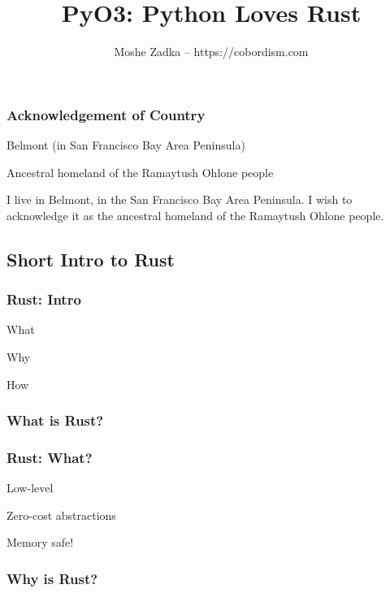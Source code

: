 \documentclass[ignorenonframetext]{beamer}
\title{PyO3: Python Loves Rust}
\author{Moshe Zadka -- https://cobordism.com}
\date{}
\begin{document}
\begin{titlepage}
\maketitle
\end{titlepage}

\frame{\titlepage}

\begin{frame}
\frametitle{Acknowledgement of Country}

Belmont (in San Francisco Bay Area Peninsula)

Ancestral homeland of the Ramaytush Ohlone people

\end{frame}

I live in Belmont, in the San Francisco Bay Area Peninsula. I wish to
acknowledge it as the ancestral homeland of the Ramaytush Ohlone people.

\hypertarget{short-intro-to-rust}{%
\subsection{Short Intro to Rust}\label{short-intro-to-rust}}

\begin{frame}
\frametitle{Rust: Intro}

\pause

What \pause

Why \pause

How

\end{frame}

\hypertarget{what-is-rust}{%
\subsubsection{What is Rust?}\label{what-is-rust}}

\begin{frame}
\frametitle{Rust: What?}

\pause

Low-level \pause

Zero-cost abstractions \pause

Memory safe!

\end{frame}

\hypertarget{why-is-rust}{%
\subsubsection{Why is Rust?}\label{why-is-rust}}
\end{document}

